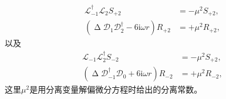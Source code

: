 \begin{equation*}
	\begin{aligned}
		\mathcal{L}_{-1}^{\dagger }\mathcal{L}_{2} S_{+2} & =-\mu ^{2} S_{+2} ,\\
		(\upDelta \mathcal{D}_{1}\mathcal{D}_{2}^{\dagger } -6\mathrm{i} \omega r)R_{+2} & =+\mu ^{2} R_{+2} ,
	\end{aligned}
\end{equation*}
以及
\begin{equation*}
	\begin{aligned}
		\mathcal{L}_{-1}\mathcal{L}_{2}^{\dagger } S_{-2} & =-\mu ^{2} S_{+2} ,\\
		(\upDelta \mathcal{D}_{-1}^{\dagger }\mathcal{D}_{0} +6\mathrm{i} \omega r)R_{-2} & =+\mu ^{2} R_{-2} ,
	\end{aligned}
\end{equation*}
这里$\mu ^{2}$是用分离变量解偏微分方程时给出的分离常数。



